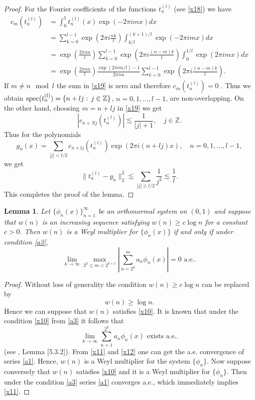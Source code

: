 \documentclass[12pt,reqno,fleqn]{amsart}
\theoremstyle{plain} %
\newtheorem{lemma}{Lemma}[section]
\theoremstyle{remark}
\def\spec{{\rm spec}}
\def\ZZ{\ensuremath{\mathbb Z}}
\theoremstyle{plain}
\numberwithin{equation}{section}
\newcommand {\e }[1]{\eqref{#1}}
\begin{document}
\begin{proof}
For the Fourier coefficients of the functions $t_n^{(l)}$ (see \e{x18}) we have
\begin{align}
	c_m(t_n^{(l)})&=\int_0^1t_n^{(l)}(x)\exp\left(-2\pi i mx\right)dx\\
	&=\sum_{k=0}^{l-1}\exp\left(2\pi i \frac{nk}{l}\right)\int_{k/l}^{(k+1)/l}\exp\left(-2\pi i mx\right)dx\\
	&=\exp\left(\frac{2\pi im}{l}\right)\sum_{k=0}^{l-1}\exp\left(2\pi i \frac{(n-m)k}{l}\right)\int_{0}^{1/l}\exp\left(2\pi i mx\right)dx\\
	&=\exp\left(\frac{2\pi im}{l}\right)\frac{\exp(2\pi im/l)-1}{2\pi im}\sum_{k=0}^{l-1}\exp\left(2\pi i \frac{(n-m)k}{l}\right).\label{x19}
\end{align}
If $m\neq n\mod l$ the sum in \e{x19} is zero and therefore $c_m(t_n^{(l)})=0$ . Thus we obtain $\spec(t_n^{(l)})=\{n+lj:\, j\in \ZZ\}$, $n=0,1,\ldots, l-1$, are non-overlapping. On the other hand, choosing $m=n+lj$ in \e{x19} we get 
\begin{equation}\label{x9}
	|c_{n+Nj}(t_n^{(l)})|\lesssim \frac{1}{|j|+1},\quad j\in \ZZ.
\end{equation}
Thus for the polynomials
\begin{equation*}
	g_n(x)=\sum_{|j|< l/2}c_{n+lj}(t_n^{(l)})\exp\left( 2\pi i (n+lj)x\right),\quad n=0,1,\ldots, l-1,
\end{equation*}
we get
\begin{equation*}
	\|t_n^{(l)}-g_n\|_2^2\lesssim \sum_{|j|\ge l/2}\frac{1}{j^2}\lesssim \frac{1}{l}.
\end{equation*}
This completes the proof of the lemma.
\end{proof}
\begin{lemma}\label{L4}
	Let $\{\phi_n(x)\}_{n=1}^\infty$ be an orthonormal system on $(0,1)$ and suppose that $w(n)$ is an increasing sequence satisfying $w(n)\ge c\log n$ for a constant $c>0$. Then $w(n)$ is a Weyl multiplier for  $\{\phi_n(x)\}$ if and only if under condition \e{a3},
\begin{equation}\label{x11}
	\lim_{k\to\infty}\max_{2^k\le m<2^{k+1}}\left|\sum_{n=2^k}^ma_n\phi_n(x)\right|=0\text{ a.e..}
\end{equation}
\end{lemma}
\begin{proof}
	Without loss of generality the condition $w(n)\ge c\log n$ can be replaced by 
	\begin{equation}\label{x10}
		w(n)\ge \log n. 
	\end{equation}
	Hence we can suppose that $w(n)$ satisfies \e{x10}. It is known that under the condition \e{x10} from \e{a3} it follows that
	\begin{equation}\label{x12}
		\lim_{k\to\infty}\sum_{n=1}^{2^{k}}a_n\phi_n(x)\text{ exists a.e..}
	\end{equation}
(see \cite{KaSt}, Lemma [5.3.2]). From \e{x11} and \e{x12} one can get the a.e. convergence of series \e{a1}. Hence, $w(n)$ is a Weyl multiplier for the system $\{\phi_n\}$. Now suppose conversely that
$w(n)$ satisfies \e{x10}  and it is a Weyl multiplier for $\{\phi_n\}$. Then under the condition \e{a3} series \e{a1} converges a.e., which immediately implies \e{x11}.
\end{proof}
\end{document}
